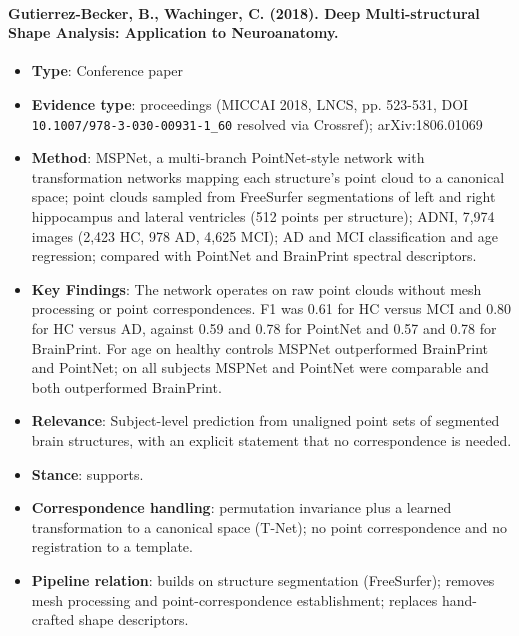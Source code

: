 \documentclass[journal,onecolumn]{IEEEtran}
\begin{document}
\paragraph{Gutierrez-Becker, B., Wachinger, C. (2018). Deep Multi-structural Shape Analysis: Application to Neuroanatomy.~\cite{GutierrezBecker2018MSPNet}}\mbox{}

\begin{itemize}

\item{} \textbf{Type}: Conference paper

\item{} \textbf{Evidence type}: proceedings (MICCAI 2018, LNCS, pp. 523-531, DOI \nolinkurl{10.1007/978-3-030-00931-1_60} resolved via Crossref); arXiv:1806.01069

\item{} \textbf{Method}: MSPNet, a multi-branch PointNet-style network with transformation networks mapping each structure's point cloud to a canonical space; point clouds sampled from FreeSurfer segmentations of left and right hippocampus and lateral ventricles (512 points per structure); ADNI, 7,974 images (2,423 HC, 978 AD, 4,625 MCI); AD and MCI classification and age regression; compared with PointNet and BrainPrint spectral descriptors.

\item{} \textbf{Key Findings}: The network operates on raw point clouds without mesh processing or point correspondences. F1 was 0.61 for HC versus MCI and 0.80 for HC versus AD, against 0.59 and 0.78 for PointNet and 0.57 and 0.78 for BrainPrint. For age on healthy controls MSPNet outperformed BrainPrint and PointNet; on all subjects MSPNet and PointNet were comparable and both outperformed BrainPrint.

\item{} \textbf{Relevance}: Subject-level prediction from unaligned point sets of segmented brain structures, with an explicit statement that no correspondence is needed.

\item{} \textbf{Stance}: supports.

\item{} \textbf{Correspondence handling}: permutation invariance plus a learned transformation to a canonical space (T-Net); no point correspondence and no registration to a template.

\item{} \textbf{Pipeline relation}: builds on structure segmentation (FreeSurfer); removes mesh processing and point-correspondence establishment; replaces hand-crafted shape descriptors.


\end{itemize}
\end{document}
